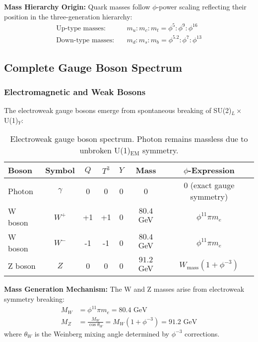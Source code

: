 \textbf{Mass Hierarchy Origin:}
Quark masses follow $\phi$-power scaling reflecting their position in the three-generation hierarchy:
\begin{align}
\text{Up-type masses:} &\quad m_u : m_c : m_t = \phi^5 : \phi^9 : \phi^{16}\\
\text{Down-type masses:} &\quad m_d : m_s : m_b = \phi^{5.2} : \phi^7 : \phi^{13}
\end{align}

\subsection{Complete Gauge Boson Spectrum}

\subsubsection{Electromagnetic and Weak Bosons}

The electroweak gauge bosons emerge from spontaneous breaking of SU(2)$_L \times$ U(1)$_Y$:

\begin{table}[H]
\centering
\begin{tabular}{|l|c|c|c|c|c|c|}
\hline
\textbf{Boson} & \textbf{Symbol} & \textbf{$Q$} & \textbf{$T^3$} & \textbf{$Y$} & \textbf{Mass} & \textbf{$\phi$-Expression} \\
\hline
Photon & $\gamma$ & 0 & 0 & 0 & 0 & 0 (exact gauge symmetry) \\
W boson & $W^+$ & +1 & +1 & 0 & $80.4$ GeV & $\phi^{11} \pi m_e$ \\
W boson & $W^-$ & -1 & -1 & 0 & $80.4$ GeV & $\phi^{11} \pi m_e$ \\
Z boson & $Z$ & 0 & 0 & 0 & $91.2$ GeV & $W_{\text{mass}} (1 + \phi^{-3})$ \\
\hline
\end{tabular}
\caption{Electroweak gauge boson spectrum. Photon remains massless due to unbroken U(1)$_{\text{EM}}$ symmetry.}
\end{table}

\textbf{Mass Generation Mechanism:}
The W and Z masses arise from electroweak symmetry breaking:
\begin{align}
M_W &= \phi^{11} \pi m_e = 80.4 \text{ GeV}\\
M_Z &= \frac{M_W}{\cos \theta_W} = M_W (1 + \phi^{-3}) = 91.2 \text{ GeV}
\end{align}
where $\theta_W$ is the Weinberg mixing angle determined by $\phi^{-3}$ corrections.

